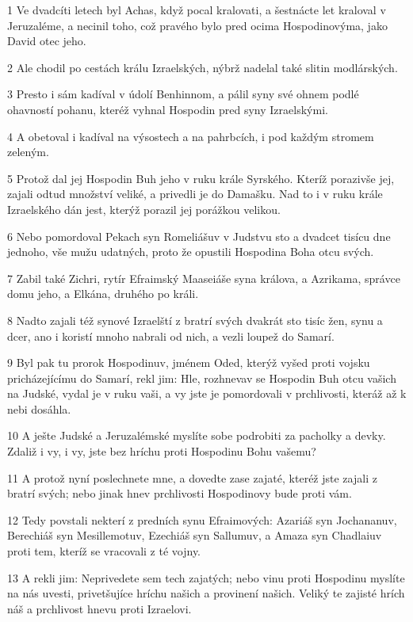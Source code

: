 \par 1 Ve dvadcíti letech byl Achas, když pocal kralovati, a šestnácte let kraloval v Jeruzaléme, a necinil toho, což pravého bylo pred ocima Hospodinovýma, jako David otec jeho.
\par 2 Ale chodil po cestách králu Izraelských, nýbrž nadelal také slitin modlárských.
\par 3 Presto i sám kadíval v údolí Benhinnom, a pálil syny své ohnem podlé ohavností pohanu, kteréž vyhnal Hospodin pred syny Izraelskými.
\par 4 A obetoval i kadíval na výsostech a na pahrbcích, i pod každým stromem zeleným.
\par 5 Protož dal jej Hospodin Buh jeho v ruku krále Syrského. Kteríž porazivše jej, zajali odtud množství veliké, a privedli je do Damašku. Nad to i v ruku krále Izraelského dán jest, kterýž porazil jej porážkou velikou.
\par 6 Nebo pomordoval Pekach syn Romeliášuv v Judstvu sto a dvadcet tisícu dne jednoho, vše mužu udatných, proto že opustili Hospodina Boha otcu svých.
\par 7 Zabil také Zichri, rytír Efraimský Maaseiáše syna králova, a Azrikama, správce domu jeho, a Elkána, druhého po králi.
\par 8 Nadto zajali též synové Izraelští z bratrí svých dvakrát sto tisíc žen, synu a dcer, ano i koristí mnoho nabrali od nich, a vezli loupež do Samarí.
\par 9 Byl pak tu prorok Hospodinuv, jménem Oded, kterýž vyšed proti vojsku pricházejícímu do Samarí, rekl jim: Hle, rozhnevav se Hospodin Buh otcu vašich na Judské, vydal je v ruku vaši, a vy jste je pomordovali v prchlivosti, kteráž až k nebi dosáhla.
\par 10 A ješte Judské a Jeruzalémské myslíte sobe podrobiti za pacholky a devky. Zdaliž i vy, i vy, jste bez hríchu proti Hospodinu Bohu vašemu?
\par 11 A protož nyní poslechnete mne, a dovedte zase zajaté, kteréž jste zajali z bratrí svých; nebo jinak hnev prchlivosti Hospodinovy bude proti vám.
\par 12 Tedy povstali nekterí z predních synu Efraimových: Azariáš syn Jochananuv, Berechiáš syn Mesillemotuv, Ezechiáš syn Sallumuv, a Amaza syn Chadlaiuv proti tem, kteríž se vracovali z té vojny.
\par 13 A rekli jim: Neprivedete sem tech zajatých; nebo vinu proti Hospodinu myslíte na nás uvesti, privetšujíce hríchu našich a provinení našich. Veliký te zajisté hrích náš a prchlivost hnevu proti Izraelovi.
